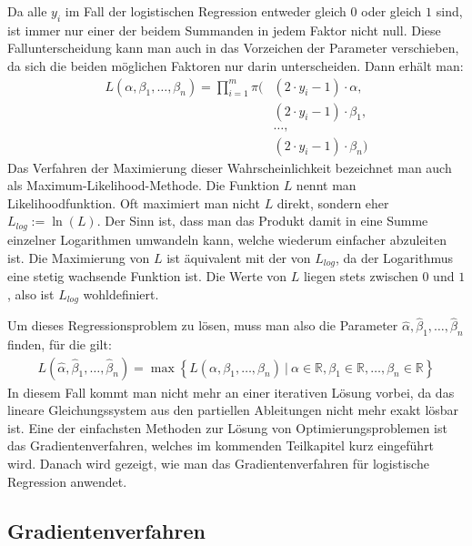Da alle $y_i$ im Fall der logistischen Regression entweder gleich $0$ oder gleich $1$ sind, ist immer nur einer der beidem Summanden in jedem Faktor nicht null. Diese Fallunterscheidung kann man auch in das Vorzeichen der Parameter verschieben, da sich die beiden möglichen Faktoren nur darin unterscheiden. Dann erhält man:
\begin{align*}
    L(\alpha, \beta_1, \dots, \beta_n) = \prod_{i=1}^m \pi(&(2 \cdot y_i - 1) \cdot \alpha, \\
    &(2 \cdot y_i - 1) \cdot \beta_1, \\
    &\dots, \\
    &(2 \cdot y_i - 1) \cdot \beta_n)
\end{align*}
Das Verfahren der Maximierung dieser Wahrscheinlichkeit bezeichnet man auch als Maximum-Likelihood-Methode. Die Funktion $L$ nennt man Likelihoodfunktion. Oft maximiert man nicht $L$ direkt, sondern eher $L_{log} := \ln(L)$. Der Sinn ist, dass man das Produkt damit in eine Summe einzelner Logarithmen umwandeln kann, welche wiederum einfacher abzuleiten ist. Die Maximierung von $L$ ist äquivalent mit der von $L_{log}$, da der Logarithmus eine stetig wachsende Funktion ist. Die Werte von $L$ liegen stets zwischen $0$ und $1$, also ist $L_{log}$ wohldefiniert.

Um dieses Regressionsproblem zu lösen, muss man also die Parameter $\hat\alpha, \hat\beta_1, \dots, \hat\beta_n$ finden, für die gilt:
\begin{align*}
    L(\hat\alpha, \hat\beta_1, \dots, \hat\beta_n) = \max \left\{ L(\alpha, \beta_1, \dots, \beta_n) ~|~ \alpha \in \mathbb{R}, \beta_1 \in \mathbb{R}, \dots, \beta_n \in \mathbb{R} \right\}
\end{align*}
In diesem Fall kommt man nicht mehr an einer iterativen Lösung vorbei, da das lineare Gleichungssystem aus den partiellen Ableitungen nicht mehr exakt lösbar ist. Eine der einfachsten Methoden zur Lösung von Optimierungsproblemen ist das Gradientenverfahren, welches im kommenden Teilkapitel kurz eingeführt wird. Danach wird gezeigt, wie man das Gradientenverfahren für logistische Regression anwendet.

\subsection{Gradientenverfahren}

